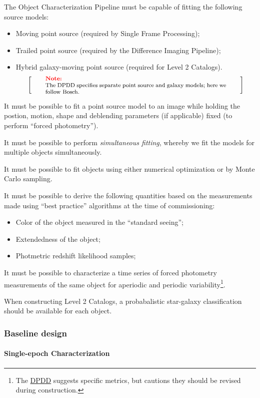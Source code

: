 \documentclass[12pt]{article}
\newcommand{\ds}[2]{{\color{blue} \href{https://docushare.lsstcorp.org/docushare/dsweb/Get/#1}{#2}}\xspace}
\newcommand{\DPDD}{\ds{LSE-163}{DPDD}}
\newenvironment{note}[1][Note]
{
  \begin{displaymath}
    \left[ \qquad
    \begin{minipage}[h]{.75\linewidth}
      \color{red} \footnotesize
      \textbf{#1:} \newline
      \color{black}
}
{
    \end{minipage}
    \normalsize
    \qquad \right]
  \end{displaymath}
}
\begin{document}
The Object Characterization Pipeline must be capable of fitting the following source models:
\begin{itemize}
  \item{Moving point source (required by Single Frame Processing);}
  \item{Trailed point source (required by the Difference Imaging Pipeline);}
  \item{Hybrid galaxy-moving point source (required for Level 2 Catalogs).
    \begin{note}
    The DPDD specifies separate point source and galaxy models; here we follow Bosch.
    \end{note}
  }
\end{itemize}

It must be possible to fit a point source model to an image while holding the postion, motion, shape and deblending parameters (if applicable) fixed (to perform ``forced photometry'').

It must be possible to perform \textit{simultaneous fitting}, whereby we fit the models for multiple objects simultaneously.

It must be possible to fit objects using either numerical optimization or by Monte Carlo sampling.

It must be possible to derive the following quantities based on the measurements made using ``best practice'' algorithms at the time of commissioning:
\begin{itemize}
  \item{Color of the object measured in the ``standard seeing'';}
  \item{Extendedness of the object;}
  \item{Photmetric redshift likelihood samples;}
\end{itemize}

It must be possible to characterize a time series of forced photometry measurements of the same object for aperiodic and periodic variability\footnote{The \DPDD{} suggests specific metrics, but cautions they should be revised during construction.}.

When constructing Level 2 Catalogs, a probabalistic star-galaxy classification should be available for each object.

\subsubsection{Baseline design}

\paragraph{Single-epoch Characterization}
\end{document}
